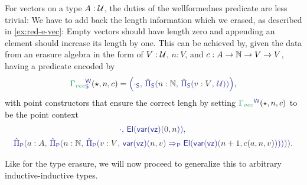 \begin{example}[Vectors]\label{ex:red-w-vec}
For vectors on a type $A : \mathcal{U}$, the duties of the wellformednes predicate are less trivial:
We have to add back the length information which we erased, as described in
\ref{ex:red-e-vec}:
Empty vectors should have length zero and appending an element should increase its
length by one.
This can be achieved by, given the data from an erasure algebra in the form of
$V : \mathcal{U}$, $n: V$, and $c : A \to \mathbb{N} \to V \to V$,
having a predicate encoded by
\begin{equation*}
\tqm{\grm{\Gamma_{vec}}^\WW_\Sc}(\star, n, c)
  = \tqm{\left(\cdot_\Sc,\, \ExtPiS{n : \N}{\ExtPiS{v : V}{\UU}} \right)} \text{,}
\end{equation*}
with point constructors that ensure the correct lengh by setting $\tqm{\grm{\Gamma_{vec}}^\WW}(\star, n, c)$ to be the point context
\begin{equation*}
\begin{gathered}
\tqm{\cdot,\, \El(\var(\vz)(\blm{0}, \blm{n})),\,} \\
\tqm{\ExtPiP{a: A}{\ExtPiP{n : \N}{\ExtPiP{v : V}{\var(\vz)(\blm{n}, \blm{v}) \Rightarrow_\Pc 
  \El(\var(\vz)(\blm{n + 1}, \blm{c(a, n, v)}) ) } } } } \text{.}
\end{gathered}
\end{equation*}
\end{example}

Like for the type erasure, we will now proceed to generalize this to arbitrary
inductive-inductive types.

